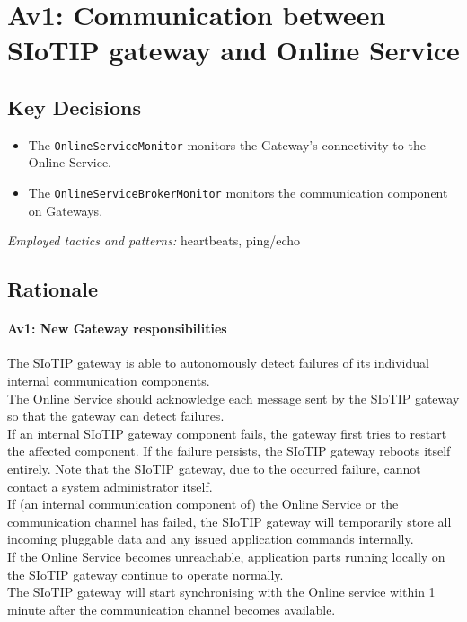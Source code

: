 \section{Av1: Communication between SIoTIP gateway and Online Service}


    \subsection*{Key Decisions}

        \begin{itemize}
        	\item The \texttt{OnlineServiceMonitor} monitors the Gateway's connectivity to the Online Service.
        	\item The \texttt{OnlineServiceBrokerMonitor} monitors the communication component on Gateways.
        \end{itemize}
        \emph{Employed tactics and patterns:} heartbeats, ping/echo


    \subsection*{Rationale}
        \paragraph{Av1: New Gateway responsibilities}
            The SIoTIP gateway is able to autonomously detect failures of its individual internal communication components.\\
            The Online Service should acknowledge each message sent by the SIoTIP gateway so that the gateway can detect failures.\\
            If an internal SIoTIP gateway component fails, the gateway first tries to restart the affected component.
            If the failure persists, the SIoTIP gateway reboots itself entirely. Note that the SIoTIP gateway,
            due to the occurred failure, cannot contact a system administrator itself.\\
            If (an internal communication component of) the Online Service or the communication
            channel has failed, the SIoTIP gateway will temporarily store all incoming pluggable data
            and any issued application commands internally.\\
            If the Online Service becomes unreachable, application parts running locally on the SIoTIP
            gateway continue to operate normally.\\
            The SIoTIP gateway will start synchronising with the Online service within 1 minute after the
            communication channel becomes available.\\
        
